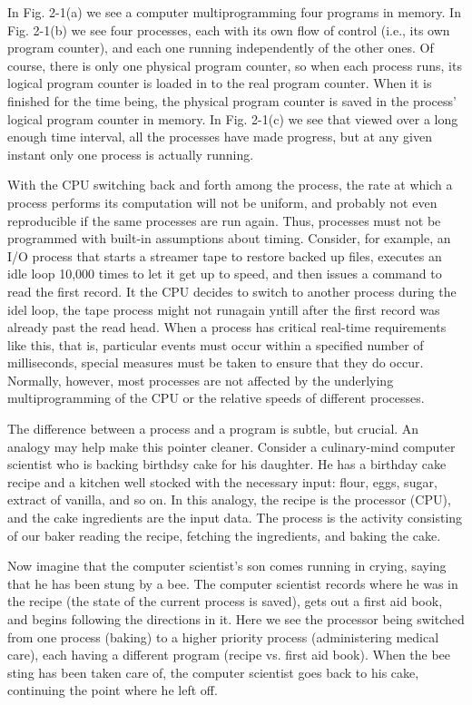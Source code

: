 \documentclass{book}
\begin{document}
In Fig. 2-1(a) we see a computer multiprogramming four programs in memory.
In Fig. 2-1(b) we see four processes, each with its own flow of control (i.e., its own program counter), 
and each one running independently of the other ones.
Of course, there is only one physical program counter, so when each process runs, 
its logical program counter is loaded in to the real program counter. 
When it is finished for the time being, the physical program counter is saved in the process' logical program counter in memory.
In Fig. 2-1(c) we see that viewed over a long enough time interval, all the processes have made progress,
but at any given instant only one process is actually running.

With the CPU switching back and forth among the process, the rate at which a process performs its computation will not be uniform, 
and probably not even reproducible if the same processes are run again.
Thus, processes must not be programmed with built-in assumptions about timing.
Consider, for example, an I/O process that starts a streamer tape to restore backed up files,
executes an idle loop 10,000 times to let it get up to speed, and then issues a command to read the first record.
It the CPU decides to switch to another process during the idel loop,
the tape process might not runagain yntill after the first record was already past the read head.
When a process has critical real-time requirements like this, that is, 
particular events must occur within a specified number of milliseconds, special measures must be taken to ensure that they do occur.
Normally, however, most processes are not affected by the underlying multiprogramming of the CPU or the relative speeds of different processes.

The difference between a process and a program is subtle, but crucial.
An analogy may help make this pointer cleaner.
Consider a culinary-mind computer scientist who is backing birthdsy cake for his daughter.
He has a birthday cake recipe and a kitchen well stocked with the necessary input:
flour, eggs, sugar, extract of vanilla, and so on.
In this analogy, the recipe is the processor (CPU), and the cake ingredients are the input data.
The process is the activity consisting of our baker reading the recipe, fetching the ingredients, and baking the cake.
 
Now imagine that the computer scientist's son comes running in crying, saying that he has been stung by a bee.
The computer scientist records where he was in the recipe (the state of the current process is saved),
gets out a first aid book, and begins following the directions in it.
Here we see the processor being switched from one process (baking) to a higher priority process (administering medical care),
each having a different program (recipe vs. first aid book).
When the bee sting has been taken care of, the computer scientist goes back to his cake,
continuing the point where he left off.
\end{document}
